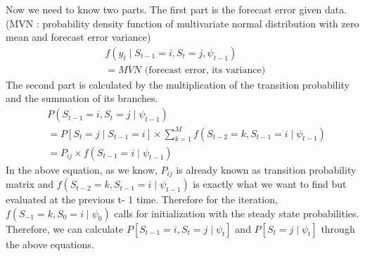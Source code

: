 \documentclass[UTF8,12pt]{ctexart}
\numberwithin{equation}{section}%
\begin{document}
	Now we need to know two parts. The first part is the forecast error given data. (MVN : probability density function of multivariate normal distribution with zero mean and forecast error variance)
	$$
	\begin{aligned}
		& f\left(y_t \mid S_{t-1}=i, S_t=j, \psi_{t-1}\right) \\
		& =M V N \text { (forecast error, its variance) }
	\end{aligned}
	$$
	The second part is calculated by the multiplication of the transition probability and the summation of its branches.
	$$
	\begin{aligned}
		& P\left(S_{t-1}=i, S_t=j \mid \psi_{t-1}\right) \\
		& =P\left[S_t=j \mid S_{t-1}=i\right] \times \sum_{k=1}^M f\left(S_{t-2}=k, S_{t-1}=i \mid \psi_{t-1}\right) \\
		& =P_{i j} \times f\left(S_{t-1}=i \mid \psi_{t-1}\right)
	\end{aligned}
	$$
	In the above equation, as we know, $P_{i j}$ is already known as transition probability matrix and $f\left(S_{t-2}=k, S_{t-1}=i \mid \psi_{t-1}\right)$ is exactly what we want to find but evaluated at the previous t- 1 time. Therefore for the iteration, $f\left(S_{-1}=k, S_0=i \mid \psi_0\right)$ calls for initialization with the steady state probabilities.
	Therefore, we can calculate $P\left[S_{t-1}=i, S_t=j \mid \psi_t\right]$ and $P\left[S_t=j \mid \psi_t\right]$ through the above equations.
	
\end{document}
